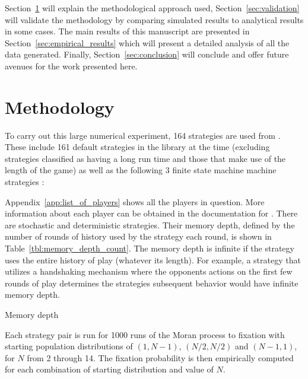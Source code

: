 \documentclass{article}
\begin{document}
Section~\ref{sec:methodology} will explain the methodological approach used,
Section~\ref{sec:validation} will validate the methodology by comparing
simulated results to analytical results in some cases. The main results of this manuscript are
presented in Section~\ref{sec:empirical_results} which will present a detailed
analysis of all the data generated. Finally, Section~\ref{sec:conclusion} will
conclude and offer future avenues for the work presented here.

\section{Methodology}\label{sec:methodology}

To carry out this large numerical experiment, 164 strategies are used from
\cite{axelrodproject}. These include 161 default strategies in the library at
the time (excluding strategies classified as having a long run time and those
that make use of the length of the game) as well as
the following 3 finite state machine machine strategies \cite{Ashlock2006}:


Appendix~\ref{app:list_of_players} shows all the players in question. More
information about each player can be obtained in the documentation for
\cite{axelrodproject}. There are stochastic and
deterministic strategies. Their memory
depth, defined by the number of rounds of history used by the strategy each round,
is shown in Table~\ref{tbl:memory_depth_count}. The memory depth is infinite if
the strategy uses the entire history of play (whatever its length). For example,
a strategy that utilizes a handshaking mechanism where the opponents actions
on the first few rounds of play determines the strategies subsequent behavior
would have infinite memory depth.

\begin{table}[!hbtp]
    \centering
        
        \caption{Memory depth}
        \label{tbl:memory_depth_count}
\end{table}

Each strategy pair is run for 1000 runs of the Moran process to fixation
with starting population distributions of $(1, N-1)$,
$(N/2, N/2)$ and $(N-1 , 1)$, for \(N\) from 2 through 14. The
fixation probability is then empirically computed for each combination of
starting distribution and value of \(N\).
\end{document}
